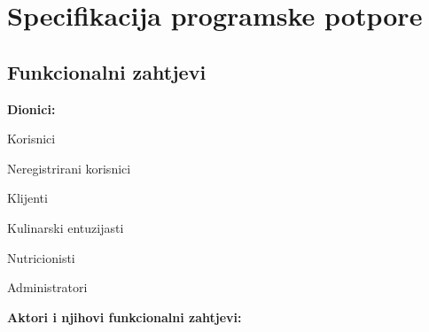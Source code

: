 \chapter{Specifikacija programske potpore}
		
	\section{Funkcionalni zahtjevi}
			
			
				
			
			
			\noindent \textbf{Dionici:}
			
			\begin{packed_enum}
				
				\item Korisnici
				\item[]\begin{packed_enum}
					\item Neregistrirani korisnici
					\item Klijenti
					\item Kulinarski entuzijasti
					\item Nutricionisti
				\end{packed_enum}
				\item Administratori
				
			\end{packed_enum}
			
			\noindent \textbf{Aktori i njihovi funkcionalni zahtjevi:}
			
